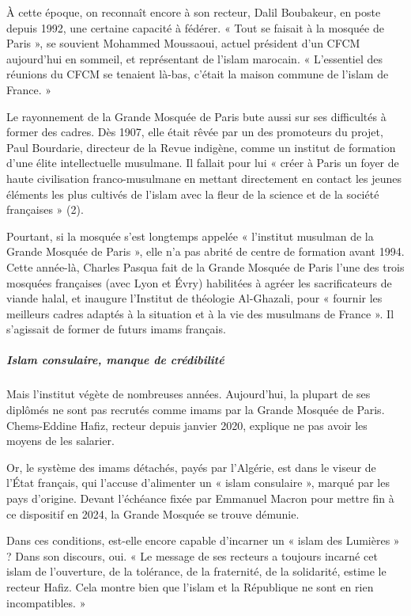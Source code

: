 À cette époque, on reconnaît encore à son recteur, Dalil Boubakeur, en poste depuis 1992, une certaine capacité à fédérer. « Tout se faisait à la mosquée de Paris », se souvient Mohammed Moussaoui, actuel président d’un CFCM aujourd’hui en sommeil, et représentant de l’islam marocain. « L’essentiel des réunions du CFCM se tenaient là-bas, c’était la maison commune de l’islam de France. »

 
Le rayonnement de la Grande Mosquée de Paris bute aussi sur ses difficultés à former des cadres. Dès 1907, elle était rêvée par un des promoteurs du projet, Paul Bourdarie, directeur de la Revue indigène, comme un institut de formation d’une élite intellectuelle musulmane. Il fallait pour lui « créer à Paris un foyer de haute civilisation franco-musulmane en mettant directement en contact les jeunes éléments les plus cultivés de l’islam avec la fleur de la science et de la société françaises » (2).

Pourtant, si la mosquée s’est longtemps appelée « l’institut musulman de la Grande Mosquée de Paris », elle n’a pas abrité de centre de formation avant 1994. Cette année-là, Charles Pasqua fait de la Grande Mosquée de Paris l’une des trois mosquées françaises (avec Lyon et Évry) habilitées à agréer les sacrificateurs de viande halal, et inaugure l’Institut de théologie Al-Ghazali, pour « fournir les meilleurs cadres adaptés à la situation et à la vie des musulmans de France ». Il s’agissait de former de futurs imams français.
\subparagraph{Islam consulaire, manque de crédibilité}

Mais l’institut végète de nombreuses années. Aujourd’hui, la plupart de ses diplômés ne sont pas recrutés comme imams par la Grande Mosquée de Paris. Chems-Eddine Hafiz, recteur depuis janvier 2020, explique ne pas avoir les moyens de les salarier.

Or, le système des imams détachés, payés par l’Algérie, est dans le viseur de l’État français, qui l’accuse d’alimenter un « islam consulaire », marqué par les pays d’origine. Devant l’échéance fixée par Emmanuel Macron pour mettre fin à ce dispositif en 2024, la Grande Mosquée se trouve démunie.
 
Dans ces conditions, est-elle encore capable d’incarner un « islam des Lumières » ? Dans son discours, oui. « Le message de ses recteurs a toujours incarné cet islam de l’ouverture, de la tolérance, de la fraternité, de la solidarité, estime le recteur Hafiz. Cela montre bien que l’islam et la République ne sont en rien incompatibles. »

